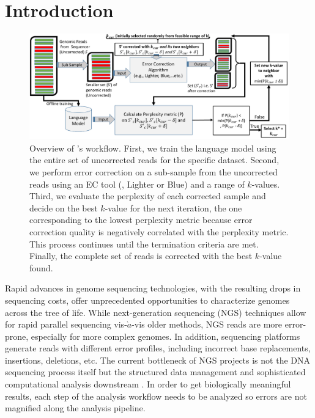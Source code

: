 \section{Introduction}
\begin{figure}
\centering
\includegraphics[width=\linewidth]{figs/AthenaOverview_Compressed2_cropped.pdf}
\caption{Overview of \name's workflow. First, we train the language model using the entire set of uncorrected reads for the specific dataset. Second, we perform error correction on a sub-sample from the uncorrected reads using an EC tool (\eg, Lighter or Blue) and a range of $k$-values. Third, we evaluate the perplexity of each corrected sample and decide on the best $k$-value for the next iteration, \ie the one corresponding to the lowest perplexity metric because error correction quality is negatively correlated with the perplexity metric. This process continues until the termination criteria are met. Finally, the complete set of reads is corrected with the best $k$-value found.}	
\label{fig:AthenaOverview}
\end{figure}
\vspace{-10pt}
Rapid advances in genome sequencing technologies, with the resulting drops in sequencing costs, offer unprecedented opportunities to characterize genomes across the tree of life. %
While next-generation sequencing (NGS) techniques allow for rapid parallel sequencing vis-$\grave{a}$-vis older methods, NGS reads are more error-prone, especially for more complex genomes. %
In addition, sequencing platforms generate reads with different error profiles, including incorrect base replacements, insertions, deletions, etc. The current bottleneck of NGS projects is not the DNA sequencing process itself but the structured data management and sophisticated computational analysis downstream \cite{schadt2010computational}. In order to get biologically meaningful results, each step of the analysis workflow needs to be analyzed so errors are not magnified along the analysis pipeline.
